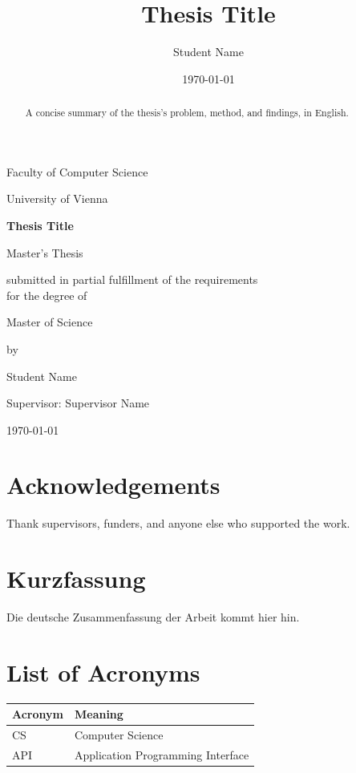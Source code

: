 \documentclass[a4paper,11pt]{report}
\title{Thesis Title}
\author{Student Name}
\date{\today}
\begin{document}
\begin{titlepage}
\centering
\vspace*{2cm}
{\LARGE Faculty of Computer Science\par}
{\large University of Vienna\par}
\vspace{3cm}
{\Huge\bfseries Thesis Title\par}
\vspace{2cm}
{\large Master's Thesis\par}
\vspace{1cm}
{\large submitted in partial fulfillment of the requirements\\
for the degree of\par}
\vspace{0.5cm}
{\large Master of Science\par}
\vspace{2cm}
{\large by\par}
{\Large Student Name\par}
\vfill
{\large Supervisor: Supervisor Name\par}
\vspace{1cm}
{\large \today\par}
\end{titlepage}

\chapter*{Acknowledgements}
Thank supervisors, funders, and anyone else who supported the work.

\begin{abstract}
A concise summary of the thesis's problem, method, and findings, in
English.
\end{abstract}

\chapter*{Kurzfassung}
Die deutsche Zusammenfassung der Arbeit kommt hier hin.

\tableofcontents
\listoffigures
\listoftables

\chapter*{List of Acronyms}
\begin{tabular}{@{}ll@{}}
\toprule
\textbf{Acronym} & \textbf{Meaning} \\
\midrule
CS & Computer Science \\
API & Application Programming Interface \\
\bottomrule
\end{tabular}
\end{document}
